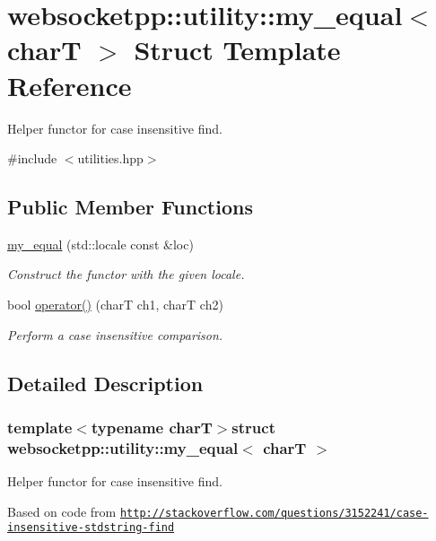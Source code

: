 \hypertarget{structwebsocketpp_1_1utility_1_1my__equal}{}\section{websocketpp\+:\+:utility\+:\+:my\+\_\+equal$<$ char\+T $>$ Struct Template Reference}
\label{structwebsocketpp_1_1utility_1_1my__equal}


Helper functor for case insensitive find.  




{\ttfamily \#include $<$utilities.\+hpp$>$}

\subsection*{Public Member Functions}
\begin{DoxyCompactItemize}
\item 
\hyperlink{structwebsocketpp_1_1utility_1_1my__equal_a8f03de886784304ffd39ed5de677af1f}{my\+\_\+equal} (std\+::locale const \&loc)
\begin{DoxyCompactList}\small\item\em Construct the functor with the given locale. \end{DoxyCompactList}\item 
bool \hyperlink{structwebsocketpp_1_1utility_1_1my__equal_a06b93db62003458703574e6421f9875f}{operator()} (char\+T ch1, char\+T ch2)
\begin{DoxyCompactList}\small\item\em Perform a case insensitive comparison. \end{DoxyCompactList}\end{DoxyCompactItemize}


\subsection{Detailed Description}
\subsubsection*{template$<$typename char\+T$>$struct websocketpp\+::utility\+::my\+\_\+equal$<$ char\+T $>$}

Helper functor for case insensitive find. 

Based on code from \href{http://stackoverflow.com/questions/3152241/case-insensitive-stdstring-find}{\tt http\+://stackoverflow.\+com/questions/3152241/case-\/insensitive-\/stdstring-\/find}

